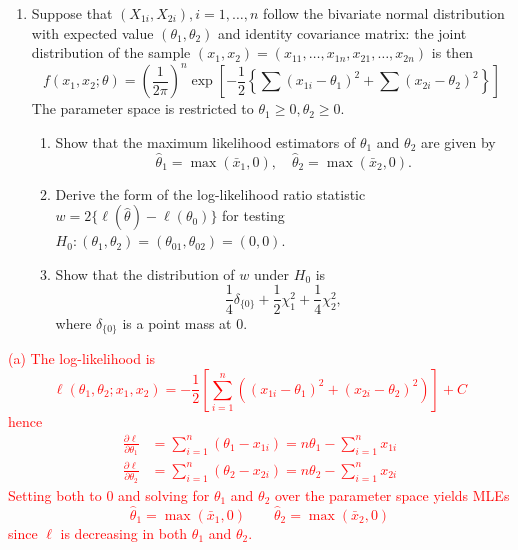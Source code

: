 \documentclass[12pt]{article}
\def\blue{\color{blue}}
\begin{document}
\begin{enumerate}
\noindent \textcolor{red}{
(b) By finite subadditivity, 
\begin{align*}
    P_{H_0}(Q \leq q^{obs}) &= P_{H_0}(\min\{P_1, \ldots, P_k\} \leq q^{obs})\\
    &= P_{H_0} \left(\bigcup_{i=1}^k \{P_i \leq q^{obs}\}\right)\\
    &\leq \sum_{i=1}^k P_{H_0} (P_i \leq q^{obs})\\
    &= \sum_{i=1}^k q^{obs}\\
    &= kq^{obs}
\end{align*}
}
\item Suppose that $(X_{1i}, X_{2i}), i = 1, \dots, n$ follow the bivariate normal distribution with expected value $(\theta_1, \theta_2)$ and identity covariance matrix: the joint distribution of the sample $(x_1, x_2) = (x_{11}, \dots , x_{1n}, x_{21}, \dots, x_{2n})$ is then
$$
f( x_1,  x_2;\theta) = \left(\frac{1}{2\pi}\right)^n\exp\left[-\frac{1}{2}\left\{\sum(x_{1i}-\theta_1)^2 + \sum(x_{2i}-\theta_2)^2\right\}\right]
$$
The parameter space is restricted to $\theta_1 \ge 0, \theta_2 \ge 0$.
\begin{enumerate}

\item Show that the maximum likelihood estimators of $\theta_1$ and $\theta_2$ are given by
$$
\hat\theta_1 = \max(\bar x_1,0), \quad \hat\theta_2 = \max(\bar x_2, 0).
$$
\item  Derive the form of the log-likelihood ratio statistic $w = 2\{\ell(\hat\theta) - \ell(\theta_0)\}$ for testing $H_0: (\theta_1, \theta_2) = (\theta_{01},\theta_{02}) = (0,0)$. %
\item   Show that 
the distribution of $w$ under $H_0$ is 
$$
\frac{1}{4}\delta_{\{0\}} + \frac{1}{2}\chi_1^2 + \frac{1}{4}\chi_2^2,
$$
where $\delta_{\{0\}}$ is a point mass at $0$.
\end{enumerate}
\end{enumerate}
\textcolor{red}{
(a) The log-likelihood is 
\begin{equation*}
    \ell(\theta_1, \theta_2 ; x_1, x_2) = -\frac{1}{2}\left[\sum_{i=1}^n \left((x_{1i} - \theta_1)^2 + (x_{2i} - \theta_2)^2 \right)\right] + C
\end{equation*}
hence 
\begin{align*}
    \frac{\partial \ell}{\partial \theta_1} &= \sum_{i=1}^n (\theta_1 - x_{1i}) = n\theta_1 - \sum_{i=1}^n x_{1i}\\
    \frac{\partial \ell}{\partial \theta_2} &= \sum_{i=1}^n (\theta_2 - x_{2i}) = n\theta_2 - \sum_{i=1}^n x_{2i}
\end{align*}
Setting both to 0 and solving for $\theta_1$ and $\theta_2$ over the parameter space yields MLEs 
\begin{equation*}
    \hat\theta_1 = \max(\bar x_1, 0) \qquad \hat\theta_2 = \max(\bar x_2, 0)
\end{equation*}
since $\ell$ is decreasing in both $\theta_1$ and $\theta_2$. 
}
\end{document}
